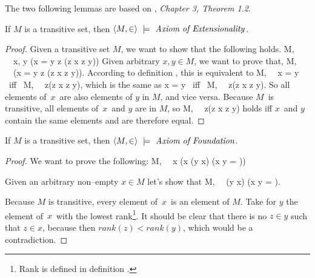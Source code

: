 
The two following lemmas are based on \cite{DrakeBook}, \emph{Chapter 3, Theorem 1.2}.
\begin{lemma}\label{lemma:extensionality_in_transitive} %
If $M$ is a transitive set, then $\langle M, \in \rangle~\models~\mbox{\emph{Axiom of Extensionality}}$.
\end{lemma}

\begin{proof}
Given a transitive set $M$, we want to show that the following holds.
\beq
\langle M, \in \rangle~\models~\forall x, y (x = y \iff \forall z (z \in x \iff z \in y))
\eeq 
Given arbitrary $x, y \in M$, we want to prove that, 
\beq
\langle M, \in \rangle~\models~(x = y \iff \forall z (z \in x \iff z \in y))\mbox{.}
\eeq
According to definition , this is equivalent to
\beq
\langle M, \in \rangle~\models~x = y \mbox{ iff } \langle M, \in \rangle~\models~\forall z(z \in x \iff z \in y)\mbox{,}
\eeq 
which is the same as
\beq
x = y \mbox{ iff } \langle M, \in \rangle~\models~\forall z(z \in x \iff z \in y)\mbox{.}
\eeq
So all elements of~$x$~are also elements of $y$ in $M$, and vice versa. 
Because $M$ is transitive, all elements of~$x$~and $y$ are in $M$, 
so
\beq \langle M, \in \rangle~\models~\forall z(z \in x \iff z \in y)
\eeq
holds iff $x$ and $y$ contain the same elements and are therefore equal.
\end{proof}

\begin{lemma}\label{lemma:foundation_in_transitive}
If $M$ is a transitive set, then $\langle M, \in \rangle~\models~\mbox{\emph{Axiom of Foundation}}$.
\end{lemma}

\begin{proof}
We want to prove the following:
\beq
\langle M, \in \rangle~\models~\forall x (x \neq \emptyset \then (\exists y \in x) (x \cap y = \emptyset))
\eeq

Given an arbitrary non–empty $x \in M$ let's show that
\beq
\langle M, \in \rangle~\models~(\exists y \in x) (x \cap y = \emptyset)\mbox{.}
\eeq

Because $M$ is transitive, every element of~$x$~is an element of $M$. Take for $y$ the element of~$x$~with the lowest rank\footnote{Rank is defined in definition .}. It should be clear that there is no $z \in y$ such that $z \in x$, because then $rank(z) < rank(y)$, which would be a contradiction.
\end{proof}


